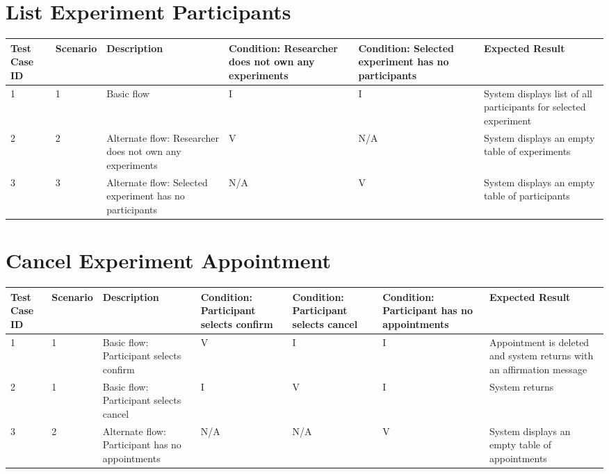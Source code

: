 \documentclass{article}
\begin{document}
\section{List Experiment Participants}
\begin{table}[!h]
    \begin{tabular}{|l|l|p{2.5cm}|p{2.5cm}|p{2.5cm}|p{2.5cm}|}
        \hline
        Test Case ID & Scenario & Description & Condition: Researcher does not own any experiments & Condition: Selected experiment has no participants & Expected Result \\ \hline
        1 & 1 & Basic flow & I & I & System displays list of all participants for selected experiment \\ \hline
        2 & 2 & Alternate flow: Researcher does not own any experiments & V & N/A & System displays an empty table of experiments \\ \hline
        3 & 3 & Alternate flow: Selected experiment has no participants & N/A & V & System displays an empty table of participants \\ \hline
    \end{tabular}
\end{table}

\section{Cancel Experiment Appointment}
\begin{table}[!h]
    \begin{tabular}{|l|l|p{2cm}|p{2cm}|p{2cm}|p{2cm}|p{2cm}|}
        \hline
        Test Case ID & Scenario & Description & Condition: Participant selects confirm & Condition: Participant selects cancel & Condition: Participant has no appointments & Expected Result \\ \hline
        1 & 1 & Basic flow: Participant selects confirm & V & I & I & Appointment is deleted and system returns with an affirmation message \\ \hline
        2 & 1 & Basic flow: Participant selects cancel & I & V & I & System returns \\ \hline
        3 & 2 & Alternate flow: Participant has no appointments & N/A & N/A & V & System displays an empty table of appointments \\ \hline
    \end{tabular}
\end{table}
\end{document}
